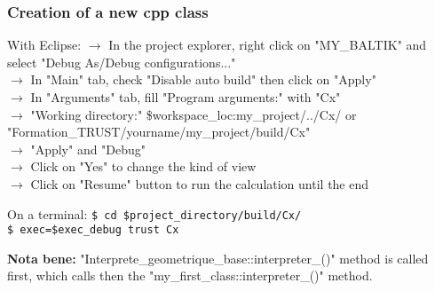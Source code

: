 \documentclass[10pt, hyperref={unicode=true,pdfusetitle, bookmarks=true,bookmarksnumbered=false,bookmarksopen=false, breaklinks=false,pdfborder={0 0 1},backref=true,colorlinks=true,linkcolor=darkblue,pageanchor, urlcolor=darkblue}]{beamer}
\begin{document}
\begin{frame}
\frametitle{Creation of a new cpp class}

\begin{exampleblock}{With Eclipse:}
    $\rightarrow$ In the project explorer, right click on "MY\_BALTIK" and select "Debug As/Debug configurations..." \\
    $\rightarrow$ In "Main" tab, check "Disable auto build" then click on "Apply"\\
    $\rightarrow$ In "Arguments" tab, fill "Program arguments:" with "Cx"\\
    $\rightarrow$ "Working directory:" \${workspace\_loc:my\_project}/../Cx/ or "Formation\_TRUST/yourname/my\_project/build/Cx"\\
    $\rightarrow$ "Apply" and "Debug"\\
    $\rightarrow$ Click on "Yes" to change the kind of view\\
    $\rightarrow$ Click on "Resume" button to run the calculation until the end\\
\end{exampleblock}    

\begin{block}{On a terminal:}
    \texttt{\$ cd \$project\_directory/build/Cx/}\\
    \texttt{\$ exec=\$exec\_debug trust Cx}\\
\end{block}    
    
\begin{block}{}
\textbf{Nota bene:} "Interprete\_geometrique\_base::interpreter\_()" method is called first,
which calls then the "my\_first\_class::interpreter\_()" method.
\end{block}

\end{frame}
\end{document}
